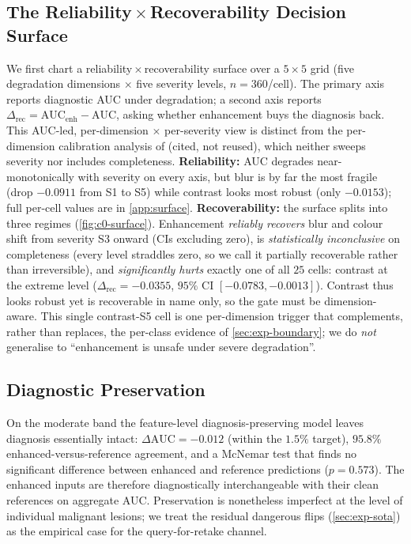 \subsection{The Reliability\,$\times$\,Recoverability Decision Surface}
\label{sec:exp-surface}
We first chart a reliability\,$\times$\,recoverability surface over a $5\times5$ grid
(five degradation dimensions $\times$ five severity levels, $n=360$/cell). The primary
axis reports diagnostic AUC under degradation; a second axis reports
$\Delta_{\text{rec}}=\mathrm{AUC}_{\text{enh}}-\mathrm{AUC}$, asking whether enhancement
buys the diagnosis back. This AUC-led, per-dimension $\times$ per-severity view is
distinct from the per-dimension calibration analysis of \citet{ANON-BMVC} (cited, not
reused), which neither sweeps severity nor includes completeness. \textbf{Reliability:}
AUC degrades near-monotonically with severity on every axis, but blur is by far the most
fragile (drop $-0.0911$ from S1 to S5) while contrast looks most robust (only $-0.0153$);
full per-cell values are in \cref{app:surface}. \textbf{Recoverability:} the surface
splits into three regimes (\cref{fig:c0-surface}). Enhancement \emph{reliably recovers}
blur and colour shift from severity S3 onward (CIs excluding zero), is
\emph{statistically inconclusive} on completeness (every level straddles zero, so we call
it partially recoverable rather than irreversible), and \emph{significantly hurts}
exactly one of all $25$ cells: contrast at the extreme level ($\Delta_{\text{rec}}=-0.0355$,
$95\%$ CI $[-0.0783,-0.0013]$). Contrast thus looks robust yet is recoverable in name
only, so the gate must be dimension-aware. This single contrast-S5 cell is one
per-dimension trigger that complements, rather than replaces, the per-class evidence of
\cref{sec:exp-boundary}; we do \emph{not} generalise to ``enhancement is unsafe under
severe degradation''.

\subsection{Diagnostic Preservation}\label{sec:exp-preserve}
On the moderate band the feature-level diagnosis-preserving model leaves diagnosis
essentially intact: $\Delta\mathrm{AUC}=-0.012$ (within the $1.5\%$ target),
$95.8\%$ enhanced-versus-reference agreement, and a McNemar test that finds no
significant difference between enhanced and reference predictions ($p=0.573$). The
enhanced inputs are therefore diagnostically interchangeable with their clean
references on aggregate AUC. Preservation is nonetheless imperfect at the level of
individual malignant lesions; we treat the residual dangerous flips (\cref{sec:exp-sota})
as the empirical case for the query-for-retake channel.

